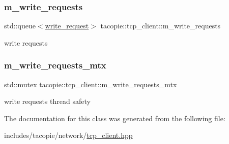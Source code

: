 \subsubsection{\texorpdfstring{m\+\_\+write\+\_\+requests}{m\_write\_requests}}
{\footnotesize\ttfamily std\+::queue$<$\hyperlink{structtacopie_1_1tcp__client_1_1write__request}{write\+\_\+request}$>$ tacopie\+::tcp\+\_\+client\+::m\+\_\+write\+\_\+requests\hspace{0.3cm}{\ttfamily [private]}}

write requests \mbox{\label{classtacopie_1_1tcp__client_abc7c664a73d528c0b1c226d35f7bae2f}} 
\subsubsection{\texorpdfstring{m\+\_\+write\+\_\+requests\+\_\+mtx}{m\_write\_requests\_mtx}}
{\footnotesize\ttfamily std\+::mutex tacopie\+::tcp\+\_\+client\+::m\+\_\+write\+\_\+requests\+\_\+mtx\hspace{0.3cm}{\ttfamily [private]}}

write requests thread safety 

The documentation for this class was generated from the following file\+:\begin{DoxyCompactItemize}
\item 
includes/tacopie/network/\hyperlink{tcp__client_8hpp}{tcp\+\_\+client.\+hpp}\end{DoxyCompactItemize}
